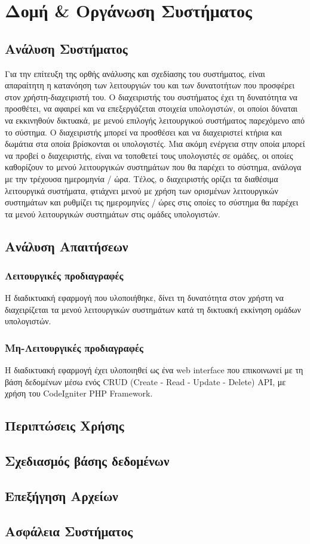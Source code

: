 \chapter{Δομή \& Οργάνωση Συστήματος}

\section{Ανάλυση Συστήματος}
Για την επίτευξη της ορθής ανάλυσης και σχεδίασης του συστήματος, είναι απαραίτητη η κατανόηση των λειτουργιών του και των δυνατοτήτων που προσφέρει στον χρήστη-διαχειριστή του. Ο διαχειριστής του συστήματος έχει τη δυνατότητα να προσθέτει, να αφαιρεί και να επεξεργάζεται στοιχεία υπολογιστών, οι οποίοι δύναται να εκκινηθούν δικτυακά, με μενού επιλογής λειτουργικού συστήματος παρεχόμενο από το σύστημα. Ο διαχειριστής μπορεί να προσθέσει και να διαχειριστεί κτήρια και δωμάτια στα οποία βρίσκονται οι υπολογιστές. Μια ακόμη ενέργεια στην οποία μπορεί να προβεί ο διαχειριστής, είναι να τοποθετεί τους υπολογιστές σε ομάδες, οι οποίες καθορίζουν το μενού λειτουργικών συστημάτων που θα παρέχει το σύστημα, ανάλογα με την τρέχουσα ημερομηνία / ώρα. Τέλος, ο διαχειριστής ορίζει τα διαθέσιμα λειτουργικά συστήματα, φτιάχνει μενού με χρήση των ορισμένων λειτουργικών συστημάτων και ρυθμίζει τις ημερομηνίες / ώρες στις οποίες το σύστημα θα παρέχει τα μενού λειτουργικών συστημάτων στις ομάδες υπολογιστών.
 
\section{Ανάλυση Απαιτήσεων}

\subsection{Λειτουργικές προδιαγραφές}
Η διαδικτυακή εφαρμογή που υλοποιήθηκε, δίνει τη δυνατότητα στον χρήστη να διαχειρίζεται τα μενού λειτουργικών συστημάτων κατά τη δικτυακή εκκίνηση ομάδων υπολογιστών.

\subsection{Μη-Λειτουργικές προδιαγραφές}
Η διαδικτυακή εφαρμογή έχει υλοποιηθεί ως ένα web interface που επικοινωνεί με τη βάση δεδομένων μέσω ενός CRUD (Create - Read - Update - Delete) API, με χρήση του CodeIgniter PHP Framework.

\section{Περιπτώσεις Χρήσης}

\section{Σχεδιασμός βάσης δεδομένων}



\section{Επεξήγηση Αρχείων}

\section{Ασφάλεια Συστήματος}

